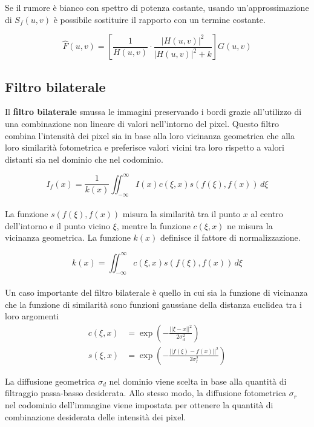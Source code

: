 \documentclass[../main.tex]{subfiles}
\begin{document}
Se il rumore è bianco con spettro di potenza costante, usando un'approssimazione di $S_f(u,v)$ è possibile sostituire il rapporto con un termine costante.

\begin{equation}
	\hat{F}(u,v)= \left[\frac{1}{H(u,v)} \cdot \frac{\left|H(u,v)\right|^2}{\left|H(u,v)\right|^2+k}\right] G(u,v)
\end{equation}

\subsection{Filtro bilaterale}

Il \textbf{filtro bilaterale} smussa le immagini preservando i bordi grazie all'utilizzo di una combinazione non lineare di valori nell'intorno del pixel. Questo filtro combina l'intensità dei pixel sia in base alla loro vicinanza geometrica che alla loro similarità fotometrica e preferisce valori vicini tra loro rispetto a valori distanti sia nel dominio che nel codominio\cite{tomasi_1998}.

\begin{equation}
	I_f(x) = \frac{1}{k(x)}\iint_{-\infty}^{\infty}I(x)c(\xi,x)s(f(\xi),f(x))\,d\xi
\end{equation}
\\[-10pt]
La funzione $s(f(\xi),f(x))$ misura la similarità tra il punto $x$ al centro dell'intorno e il punto vicino $\xi$, mentre la funzione $c(\xi,x)$ ne misura la vicinanza geometrica. La funzione $k(x)$ definisce il fattore di normalizzazione.

\begin{equation}
	k(x) = \iint_{-\infty}^{\infty}c(\xi,x)s(f(\xi),f(x))\,d\xi
\end{equation}
\\[-10pt]
Un caso importante del filtro bilaterale è quello in cui sia la funzione di vicinanza che la funzione di similarità sono funzioni gaussiane della distanza euclidea tra i loro argomenti
\begin{align}
	c(\xi,x) &= \exp\left(-\frac{||\xi-x||^2}{2\sigma^2_d}\right)\\
	s(\xi,x) &= \exp\left(-\frac{||f(\xi)-f(x)||^2}{2\sigma^2_r}\right)
\end{align}

La diffusione geometrica $\sigma_d$ nel dominio viene scelta in base alla quantità di filtraggio passa-basso desiderata. Allo stesso modo, la diffusione fotometrica $\sigma_r$ nel codominio dell'immagine viene impostata per ottenere la quantità di combinazione desiderata delle intensità dei pixel.
\end{document}
